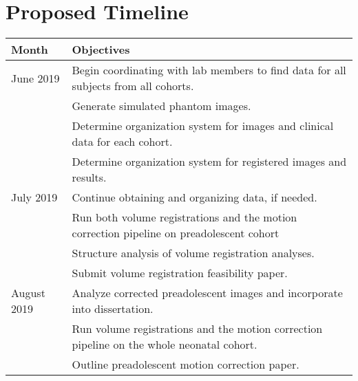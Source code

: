 \chapter{Proposed Timeline}

\begin{table}[h]
\begin{tabular}{p{}|p{}}
\textbf{Month} & \multicolumn{1}{l}{\textbf{Objectives}}                                                                         \\ \hline
June 2019      & Begin coordinating with lab members to find data for all subjects from all cohorts. \\
               & Generate simulated phantom images.                                                                               \\
               & Determine organization system for images and clinical data for each cohort.                                      \\
               & Determine organization system for registered images and results.                                                 \\ \hline
July 2019      & Continue obtaining and organizing data, if needed.                                                               \\
               & Run both volume registrations and the motion correction pipeline on preadolescent cohort                                  \\
               & Structure analysis of volume registration analyses.                                                              \\
               & Submit volume registration feasibility paper.                                                                    \\ \hline
August 2019    & Analyze corrected preadolescent images and incorporate into dissertation.                                                                          \\
               & Run volume registrations and the motion correction pipeline on the whole neonatal cohort.                        \\
               & Outline preadolescent motion correction paper.                                                                   \\

\end{tabular}
\end{table}

